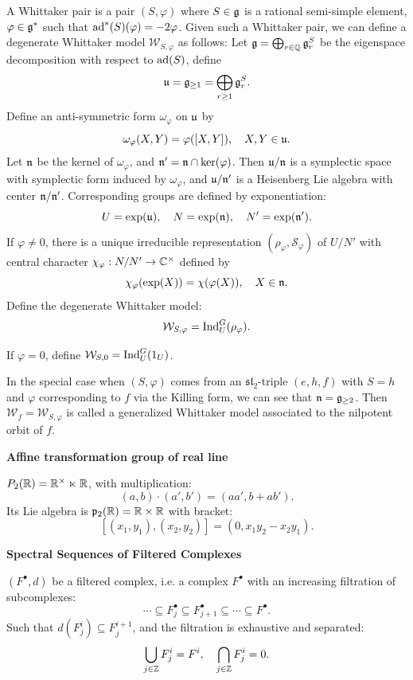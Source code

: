 A Whittaker pair is a pair $(S,\varphi)$ where $S \in \mathfrak{g}$ is a rational semi-simple element, $\varphi \in \mathfrak{g}^*$ such that $\operatorname{ad}^*(S)(\varphi) = -2\varphi$. Given such a Whittaker pair, we can define a degenerate Whittaker model $\mathcal{W}_{S,\varphi}$ as follows:
Let $\mathfrak{g} = \bigoplus_{r \in \mathbb{Q}} \mathfrak{g}^S_r$ be the eigenspace decomposition with respect to $\operatorname{ad}(S)$, define
\[ \mathfrak{u} = \mathfrak{g}_{\geq 1} = \bigoplus_{r \geq 1} \mathfrak{g}^S_r.\]
Define an anti-symmetric form $\omega_{\varphi}$ on $\mathfrak{u}$ by
\[\omega_{\varphi}(X,Y) = \varphi([X,Y]), \quad X,Y \in \mathfrak{u}.\]
Let $\mathfrak{n}$ be the kernel of $\omega_{\varphi}$, and $\mathfrak{n}' = \mathfrak{n} \cap \ker(\varphi)$. Then $\mathfrak{u}/\mathfrak{n}$ is a symplectic space with symplectic form induced by $\omega_{\varphi}$, and $\mathfrak{u}/\mathfrak{n}'$ is a Heisenberg Lie algebra with center $\mathfrak{n}/\mathfrak{n}'$. Corresponding groups are defined by exponentiation:
\[U = \exp(\mathfrak{u}), \quad N = \exp(\mathfrak{n}), \quad N' = \exp(\mathfrak{n}').\]
If $\varphi \neq 0$, there is a unique irreducible representation $(\rho_{\varphi},\mathcal{S}_{\varphi})$ of $U/N'$ with central character $\chi_{\varphi} : N/N' \to \mathbb{C}^{\times}$ defined by \[\chi_{\varphi}(\exp(X)) = \chi(\varphi(X)), \quad X \in \mathfrak{n}.\]
Define the degenerate Whittaker model:
\[\mathcal{W}_{S,\varphi} = \operatorname{Ind}_U^G(\rho_{\varphi}).\]

If $\varphi = 0$, define $\mathcal{W}_{S,0} = \operatorname{Ind}_U^G(1_U)$.

\begin{rk}
  In the special case when $(S,\varphi)$ comes from an $\mathfrak{sl}_2$-triple $(e,h,f)$ with $S = h$ and $\varphi$ corresponding to $f$ via the Killing form, we can see that $\mathfrak{n} = \mathfrak{g}_{\geq 2}$.
  Then $\mathcal{W}_f = \mathcal{W}_{S,\varphi}$ is called a generalized Whittaker model associated to the nilpotent orbit of $f$.
\end{rk}

\textbf{Affine transformation group of real line}

$P_2(\mathbb{R}) = \mathbb{R}^{\times} \ltimes \mathbb{R}$, with multiplication:
\[(a,b) \cdot (a',b') = (aa', b + ab').\]
Its Lie algebra is $\mathfrak{p}_2(\mathbb{R}) = \mathbb{R} \times \mathbb{R}$ with bracket:
\[[ (x_1,y_1), (x_2,y_2) ] = (0, x_1 y_2 - x_2 y_1).\]




\textbf{Spectral Sequences of Filtered Complexes}

$(F^{\bullet},d)$ be a filtered complex, i.e. a complex $F^{\bullet}$ with an increasing filtration of subcomplexes:
\[\cdots \subseteq F_j^{\bullet} \subseteq F^{\bullet}_{j+1} \subseteq \cdots \subseteq F^{\bullet}.\]
Such that $d(F^i_j) \subseteq F^{i+1}_j$, and the filtration is exhaustive and separated:
\[\bigcup_{j \in \mathbb{Z}} F^i_j = F^i, \quad \bigcap_{j \in \mathbb{Z}} F^i_j = 0.\]



